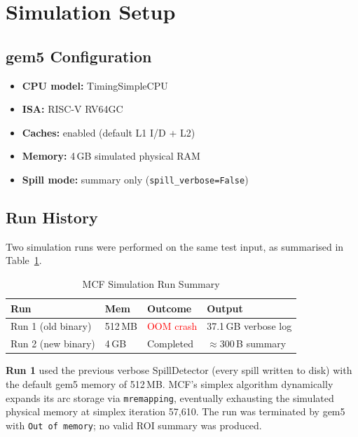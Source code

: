 \documentclass[conference]{IEEEtran}
\begin{document}
\section{Simulation Setup}

\subsection{gem5 Configuration}

\begin{itemize}
    \item \textbf{CPU model:}   TimingSimpleCPU
    \item \textbf{ISA:}         RISC-V RV64GC
    \item \textbf{Caches:}      enabled (default L1 I/D + L2)
    \item \textbf{Memory:}      4\,GB simulated physical RAM
    \item \textbf{Spill mode:}  summary only (\texttt{spill\_verbose=False})
\end{itemize}

\subsection{Run History}

Two simulation runs were performed on the same test input, as
summarised in Table~\ref{tab:runs}.

\begin{table}[H]
\centering
\caption{MCF Simulation Run Summary}
\label{tab:runs}
\begin{tabular}{llll}
\toprule
\textbf{Run} & \textbf{Mem} & \textbf{Outcome} & \textbf{Output} \\
\midrule
Run 1 (old binary) & 512\,MB & \textcolor{red}{OOM crash} & 37.1\,GB verbose log \\
Run 2 (new binary) & 4\,GB   & \textcolor{green!50!black}{Completed} & $\approx$300\,B summary \\
\bottomrule
\end{tabular}
\end{table}

\textbf{Run 1} used the previous verbose SpillDetector (every spill
written to disk) with the default gem5 memory of 512\,MB.
MCF's simplex algorithm dynamically expands its arc storage via
\texttt{mremapping}, eventually exhausting the simulated physical memory
at simplex iteration 57,610. The run was terminated by gem5 with
\texttt{Out of memory}; no valid ROI summary was produced.
\end{document}
